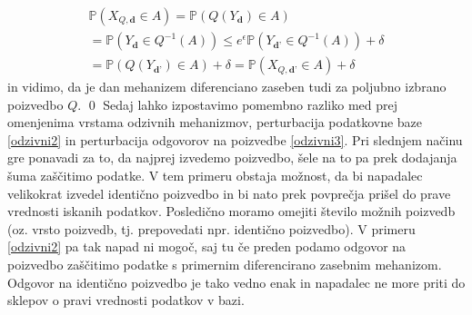 \documentclass[12pt,a4paper]{amsart}
\theoremstyle{definition} %
\theoremstyle{plain} %
\begin{document}
\begin{gather*}
\mathbb{P}(X_{Q, \textbf{d}} \in A) = \mathbb{P}(Q(Y_{ \textbf{d}}) \in A)  \\ = \mathbb{P}(Y_{\textbf{d}} \in Q^{-1}(A)) 
\leq e^\epsilon \mathbb{P}(Y_{\textbf{d'}} \in Q^{-1}(A)) + \delta \\ 
= \mathbb{P}(Q(Y_\textbf{d'}) \in A) + \delta = \mathbb{P}(X_{Q,\textbf{d'}} \in A) + \delta
\end{gather*}
in vidimo, da je dan mehanizem diferenciano zaseben tudi za poljubno izbrano poizvedbo $Q$.
\qed
\newline
\newline
Sedaj lahko izpostavimo pomembno razliko med prej omenjenima vrstama odzivnih mehanizmov, perturbacija podatkovne baze \eqref{odzivni2} in perturbacija odgovorov na poizvedbe \eqref{odzivni3}. Pri slednjem načinu gre ponavadi za to, da najprej izvedemo poizvedbo, šele na to pa prek dodajanja šuma zaščitimo podatke. V tem primeru obstaja možnost, da bi napadalec velikokrat izvedel identično poizvedbo in bi nato prek povprečja prišel do prave vrednosti iskanih podatkov. Posledično moramo omejiti število možnih poizvedb (oz. vrsto poizvedb, tj. prepovedati npr. identično poizvedbo). V primeru \eqref{odzivni2} pa tak napad ni mogoč, saj tu če preden podamo odgovor na poizvedbo zaščitimo podatke s primernim diferencirano zasebnim mehanizom. Odgovor na identično poizvedbo je tako vedno enak in napadalec ne more priti do sklepov o pravi vrednosti podatkov v bazi. 
\end{document}
